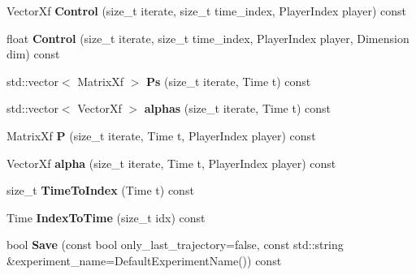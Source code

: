 \begin{DoxyCompactItemize}
\item 
Vector\+Xf {\bfseries Control} (size\+\_\+t iterate, size\+\_\+t time\+\_\+index, Player\+Index player) const \hypertarget{classilqgames_1_1_solver_log_a7bfdf2a7a7ced357eafcd36e009425d3}{}\label{classilqgames_1_1_solver_log_a7bfdf2a7a7ced357eafcd36e009425d3}

\item 
float {\bfseries Control} (size\+\_\+t iterate, size\+\_\+t time\+\_\+index, Player\+Index player, Dimension dim) const \hypertarget{classilqgames_1_1_solver_log_a73a740dd13e6f8c3c8359294e7662687}{}\label{classilqgames_1_1_solver_log_a73a740dd13e6f8c3c8359294e7662687}

\item 
std\+::vector$<$ Matrix\+Xf $>$ {\bfseries Ps} (size\+\_\+t iterate, Time t) const \hypertarget{classilqgames_1_1_solver_log_ae958cea078e821259eed40c26904bfbf}{}\label{classilqgames_1_1_solver_log_ae958cea078e821259eed40c26904bfbf}

\item 
std\+::vector$<$ Vector\+Xf $>$ {\bfseries alphas} (size\+\_\+t iterate, Time t) const \hypertarget{classilqgames_1_1_solver_log_a995476b2148f34878345d42ab9fbbc53}{}\label{classilqgames_1_1_solver_log_a995476b2148f34878345d42ab9fbbc53}

\item 
Matrix\+Xf {\bfseries P} (size\+\_\+t iterate, Time t, Player\+Index player) const \hypertarget{classilqgames_1_1_solver_log_a9074054ada0fbcc9b59b073d65252dd7}{}\label{classilqgames_1_1_solver_log_a9074054ada0fbcc9b59b073d65252dd7}

\item 
Vector\+Xf {\bfseries alpha} (size\+\_\+t iterate, Time t, Player\+Index player) const \hypertarget{classilqgames_1_1_solver_log_ac621cbe5639cf7ed168677404311efed}{}\label{classilqgames_1_1_solver_log_ac621cbe5639cf7ed168677404311efed}

\item 
size\+\_\+t {\bfseries Time\+To\+Index} (Time t) const \hypertarget{classilqgames_1_1_solver_log_ac4e09ac795276835d047795ff4ebffc7}{}\label{classilqgames_1_1_solver_log_ac4e09ac795276835d047795ff4ebffc7}

\item 
Time {\bfseries Index\+To\+Time} (size\+\_\+t idx) const \hypertarget{classilqgames_1_1_solver_log_a5ab947d807b26ae2f10663e34af24f23}{}\label{classilqgames_1_1_solver_log_a5ab947d807b26ae2f10663e34af24f23}

\item 
bool {\bfseries Save} (const bool only\+\_\+last\+\_\+trajectory=false, const std\+::string \&experiment\+\_\+name=Default\+Experiment\+Name()) const \hypertarget{classilqgames_1_1_solver_log_a84bc6c185655379e61535a9ad51263ca}{}\label{classilqgames_1_1_solver_log_a84bc6c185655379e61535a9ad51263ca}

\end{DoxyCompactItemize}



